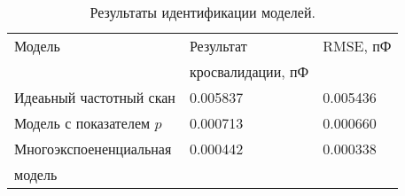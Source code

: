 	\begin{table}[!htp]
	\centering
	\caption{Результаты идентификации моделей.}
	\begin{tabular}{|l|l|l|}
		\hline
		Модель                    & Результат         & RMSE, пФ \\ 
		                          & кросвалидации, пФ &          \\ \hline
		Идеаьный частотный скан   & 0.005837          & 0.005436 \\ \hline
		Модель с показателем $p$  & 0.000713          & 0.000660 \\ \hline
		Многоэкспоененциальная    & 0.000442          & 0.000338 \\
		модель                    &                   &          \\ \hline
	\end{tabular}
	\label{table:model_comparison_303}
	\end{table}